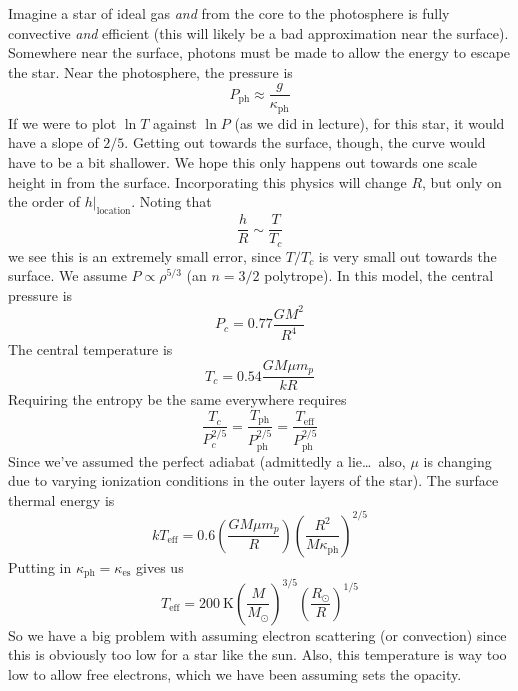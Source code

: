 \documentclass[10pt]{article}
\numberwithin{equation}{section}
\begin{document}
  Imagine a star of ideal gas \emph{and} from the core to the
  photosphere is fully convective \emph{and} efficient (this will
  likely be a bad approximation near the surface). Somewhere near the
  surface, photons must be made to allow the energy to escape the
  star. Near the photosphere, the pressure is
  \begin{equation}
    \label{eq:52}
    P_{\mathrm{ph}}\approx \frac{g}{\kappa_{\mathrm{ph}}}
  \end{equation}
  If we were to plot $\ln T$ against $\ln P$ (as we did in lecture),
  for this star, it would have a slope of $2/5$. Getting out towards
  the surface, though, the curve would have to be a bit shallower. We
  hope this only happens out towards one scale height in from the
  surface. Incorporating this physics will change $R$, but only on the
  order of $\left.h\right|_{\mathrm{location}}$. Noting that
  \begin{equation}
    \label{eq:53}
    \frac{h}{R}\sim \frac{T}{T_c}
  \end{equation}
  we see this is an extremely small error, since $T/T_c$ is very small
  out towards the surface. We assume $P\propto \rho^{5/3}$ (an $n=3/2$
  polytrope). In this model, the central pressure is
  \begin{equation}
    \label{eq:54}
    P_c=0.77\frac{GM^2}{R^4}
  \end{equation}
  The central temperature is
  \begin{equation}
    \label{eq:55}
    T_c=0.54\frac{GM\mu m_p}{kR}
  \end{equation}
  Requiring the entropy be the same everywhere requires
  \begin{equation}
    \label{eq:56}
    \frac{T_c}{P_c^{2/5}}=\frac{T_{\mathrm{ph}}}{P_{\mathrm{ph}}^{2/5}}=
\frac{T_{\mathrm{eff}}}{P_{\mathrm{ph}}^{2/5}}
  \end{equation}
  Since we've assumed the perfect adiabat (admittedly a lie\ldots\
  also, $\mu$ is changing due to varying ionization conditions in the
  outer layers of the star). The surface thermal energy is
  \begin{equation}
    \label{eq:57}
    kT_{\mathrm{eff}}=0.6\left(\frac{GM\mu m_p}{R}\right)\left(\frac{R^2}{M
\kappa_{\mathrm{ph}}}\right)^{2/5}
  \end{equation}
  Putting in $\kappa_{\mathrm{ph}}=\kappa_{\mathrm{es}}$ gives us 
  \begin{equation}
    \label{eq:58}
    T_{\mathrm{eff}}=200\ \mathrm{K}\left(\frac{M}{M_\odot}\right)^
{3/5}\left(\frac{R_\odot}{R}\right)^{1/5}
  \end{equation}
  So we have a big problem with assuming electron scattering (or
  convection) since this is obviously too low for a star like the
  sun. Also, this temperature is way too low to allow free electrons,
	which we have been assuming sets the opacity.
\end{document}
